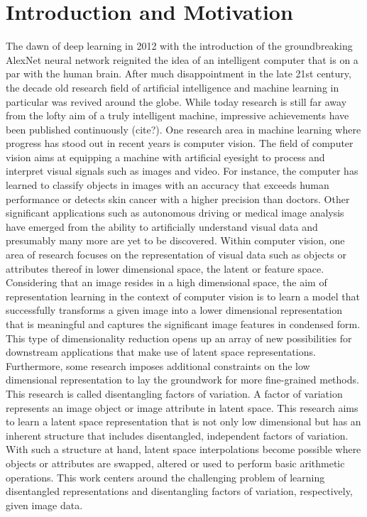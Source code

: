 \documentclass[11pt,a4paper]{article}
\begin{document}
\section{Introduction and Motivation}
The dawn of deep learning in 2012 with the introduction of the groundbreaking AlexNet neural network reignited the idea of an intelligent computer that is on a par with the human brain. After much disappointment in the late 21st century, the decade old research field of artificial intelligence and machine learning in particular was revived around the globe. While today research is still far away from the lofty aim of a truly intelligent machine, impressive achievements have been published continuously (cite?). One research area in machine learning where progress has stood out in recent years is computer vision. The field of computer vision aims at equipping a machine with artificial eyesight to process and interpret visual signals such as images and video. For instance, the computer has learned to classify objects in images with an accuracy that exceeds human performance or detects skin cancer with a higher precision than doctors. Other significant applications such as autonomous driving or medical image analysis have emerged from the ability to artificially understand visual data and presumably many more are yet to be discovered. Within computer vision, one area of research focuses on the representation of visual data such as objects or attributes thereof in lower dimensional space, the latent or feature space. Considering that an image resides in a high dimensional space, the aim of representation learning in the context of computer vision is to learn a model that successfully transforms a given image into a lower dimensional representation that is meaningful and captures the significant image features in condensed form. This type of dimensionality reduction opens up an array of new possibilities for downstream applications that make use of latent space representations. Furthermore, some research imposes additional constraints on the low dimensional representation to lay the groundwork for more fine-grained methods. This research is called disentangling factors of variation. A factor of variation represents an image object or image attribute in latent space. This research aims to learn a latent space representation that is not only low dimensional but has an inherent structure that includes disentangled, independent factors of variation. With such a structure at hand, latent space interpolations become possible where objects or attributes are swapped, altered or used to perform basic arithmetic operations. This work centers around the challenging problem of learning disentangled representations and disentangling factors of variation, respectively, given image data.
\end{document}

